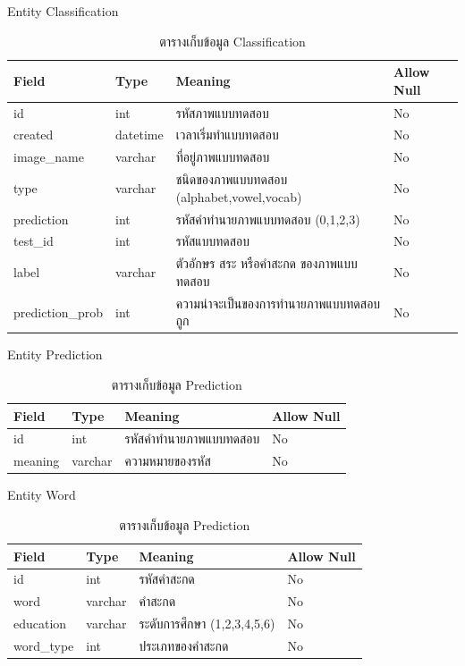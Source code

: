 \documentclass[12pt,oneside,openright,a4paper]{cpe-thai-project}
\begin{document}
      Entity Classification
      \begin{table}[!h]\centering
        \caption{ตารางเก็บข้อมูล Classification}\label{tbl:application1}
        \begin{tabular}{|p{2cm}|p{2cm}|p{7cm}|p{2cm}|} \hline
          Field & Type & Meaning & Allow Null \\ \hline
          id & int & รหัสภาพแบบทดสอบ & No \\ \hline
          created & datetime & เวลาเริ่มทำแบบทดสอบ &No \\ \hline
          image\_name & varchar & ที่อยู่ภาพแบบทดสอบ & No \\ \hline
          type & varchar & ชนิดของภาพแบบทดสอบ (alphabet,vowel,vocab) & No \\ \hline
          prediction & int & รหัสคำทำนายภาพแบบทดสอบ (0,1,2,3) & No \\ \hline
          test\_id & int & รหัสแบบทดสอบ & No \\ \hline
          label & varchar & ตัวอักษร สระ หรือคำสะกด ของภาพแบบทดสอบ & No \\ \hline
          prediction\_prob & int & ความน่าจะเป็นของการทำนายภาพแบบทดสอบถูก & No \\ \hline
        \end{tabular}
        \end{table}

        \newpage
        Entity Prediction
        \begin{table}[!h]\centering
          \caption{ตารางเก็บข้อมูล Prediction}\label{tbl:application1}
          \begin{tabular}{|p{2cm}|p{2cm}|p{7cm}|p{2cm}|} \hline
            Field & Type & Meaning & Allow Null \\ \hline
            id & int & รหัสคำทำนายภาพแบบทดสอบ & No \\ \hline
            meaning & varchar & ความหมายของรหัส &No \\ \hline
           
          \end{tabular}
          \end{table}

          
        Entity Word 
        \begin{table}[!h]\centering
          \caption{ตารางเก็บข้อมูล Prediction}\label{tbl:application1}
          \begin{tabular}{|p{2cm}|p{2cm}|p{7cm}|p{2cm}|} \hline
            Field & Type & Meaning & Allow Null \\ \hline
            id & int & รหัสคำสะกด & No \\ \hline
            word & varchar & คำสะกด &No \\ \hline
            education & varchar & ระดับการศึกษา (1,2,3,4,5,6) & No \\ \hline
            word\_type & int & ประเภทของคำสะกด &No \\ \hline
          \end{tabular}
          \end{table}
\newpage
\end{document}

